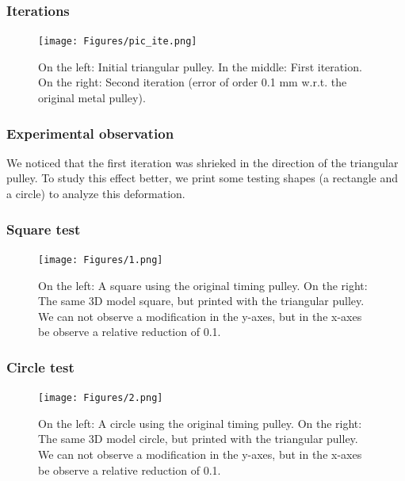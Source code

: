 \documentclass[aspectratio=169]{beamer}\usepackage[utf8]{inputenc}
\begin{document}
\begin{frame}\frametitle{Iterations}

\begin{figure}[ht!]
\centering
\texttt{[image: Figures/pic\_ite.png]}
\caption{On the left: Initial triangular pulley. In the middle: First iteration. On the right: Second iteration (error of order 0.1 mm w.r.t. the original metal pulley).}
\end{figure}

\end{frame}



\begin{frame}\frametitle{Experimental observation}

We noticed that the first iteration was shrieked in the direction of the triangular pulley. To study this effect better, we print some testing shapes (a rectangle and a circle) to analyze this deformation.

\end{frame}



\begin{frame}\frametitle{Square test}

\begin{figure}[ht!]
\centering
\texttt{[image: Figures/1.png]}
\caption{On the left: A square using the original timing pulley. On the right: The same 3D model square, but printed with the triangular pulley. We can not observe a modification in the y-axes, but in the x-axes be observe a relative reduction of 0.1.}
\end{figure}

\end{frame}



\begin{frame}\frametitle{Circle test}

\begin{figure}[ht!]
\centering
\texttt{[image: Figures/2.png]}
\caption{On the left: A circle using the original timing pulley. On the right: The same 3D model circle, but printed with the triangular pulley. We can not observe a modification in the y-axes, but in the x-axes be observe a relative reduction of 0.1.}
\end{figure}

\end{frame}
\end{document}
